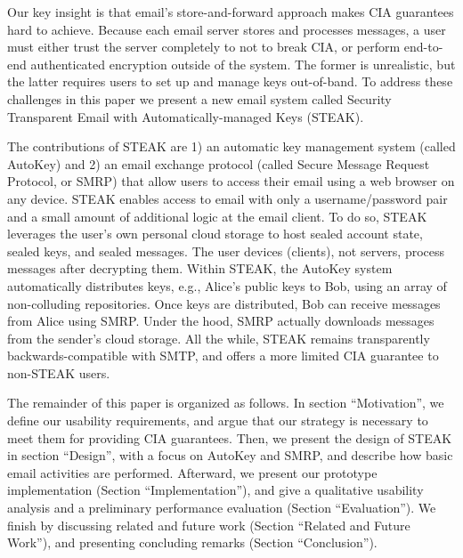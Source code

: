 Our key insight is that email's store-and-forward approach makes CIA 
guarantees hard to achieve. Because each email server stores and processes 
messages, a user must either trust the server completely to not to break 
CIA, or perform end-to-end authenticated encryption outside of the system. 
The former is unrealistic, but the latter requires users to set up and 
manage keys out-of-band. To address these challenges in this paper we 
present a new email system called Security Transparent Email with 
Automatically-managed Keys (STEAK). 

The contributions of STEAK are 1) an automatic key management system 
(called AutoKey) and 2) an email exchange protocol (called Secure Message 
Request Protocol, or SMRP) that allow users to access their email using a 
web browser on any device. STEAK enables access to email with only a 
username/password pair and a small amount of additional logic at the 
email client. To do so, STEAK leverages the user's own personal cloud 
storage to host sealed account state, sealed keys, and sealed messages. 
The user devices (clients), not servers, process messages after decrypting 
them. Within STEAK, the AutoKey system automatically distributes keys, 
e.g., Alice's public keys to Bob, using an array of non-colluding 
repositories. Once keys are distributed, Bob can receive 
messages from Alice using SMRP. Under the hood, SMRP 
actually downloads messages from the sender's cloud storage. All the while, 
STEAK remains transparently backwards-compatible with SMTP, and offers 
a more limited CIA guarantee to non-STEAK users.

The remainder of this paper is organized as follows.  In section ``Motivation'', 
we define our usability requirements, and argue that our strategy is necessary 
to meet them for providing CIA guarantees. Then, we present the design of STEAK 
in section “Design”, with a focus on AutoKey and SMRP, and describe how basic 
email activities are performed.  Afterward, we present our prototype 
implementation (Section “Implementation”), and give a qualitative usability 
analysis and a preliminary performance evaluation (Section “Evaluation”).  
We finish by discussing related and future work (Section “Related and Future 
Work”), and presenting concluding remarks (Section “Conclusion”).
